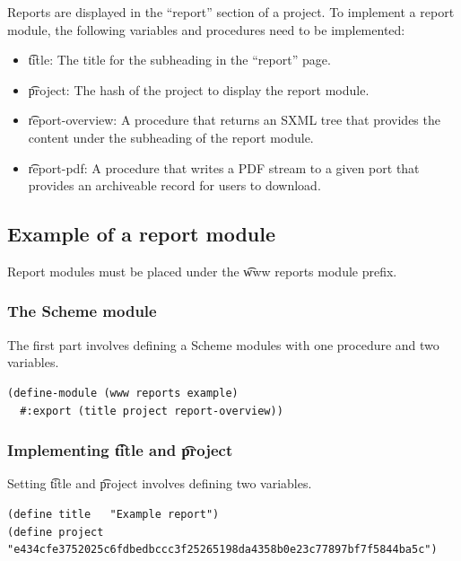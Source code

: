   Reports are displayed in the ``report'' section of a project.  To implement
  a report module, the following variables and procedures need to be implemented:
  \begin{itemize}
  \item \t{title}: The title for the subheading in the ``report'' page.
  \item \t{project}: The hash of the project to display the report module.
  \item \t{report-overview}: A procedure that returns an SXML tree that
    provides the content under the subheading of the report module.
  \item \t{report-pdf}: A procedure that writes a PDF stream to a given port
    that provides an archiveable record for users to download.
  \end{itemize}

\subsection{Example of a report module}

  Report modules must be placed under the \t{www reports} module prefix.

\subsubsection{The Scheme module}
\label{sec:scheme-module}

  The first part involves defining a Scheme modules with one procedure and
  two variables.

\begin{siderules}
\begin{verbatim}
(define-module (www reports example)
  #:export (title project report-overview))
\end{verbatim}
\end{siderules}

\subsubsection{Implementing \t{title} and \t{project}}

  Setting \t{title} and \t{project} involves defining two variables.

\begin{siderules}
\begin{verbatim}
(define title   "Example report")
(define project "e434cfe3752025c6fdbedbccc3f25265198da4358b0e23c77897bf7f5844ba5c")
\end{verbatim}
\end{siderules}

